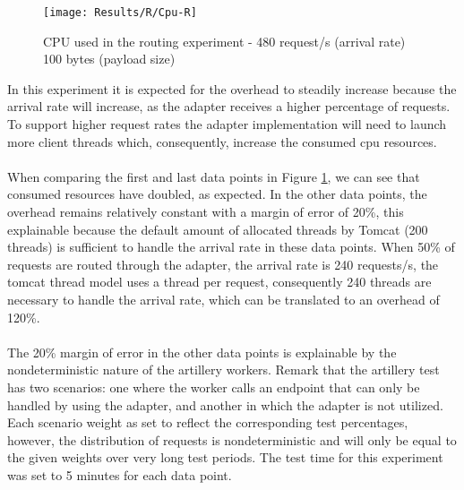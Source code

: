 \begin{figure}[htbp]
    \centering
    \centerline{\texttt{[image: Results/R/Cpu-R]}}
    \caption{CPU used in the routing experiment - 480 request/s (arrival rate) 100 bytes (payload size)}
    \label{fig:routCpu}
\end{figure}

In this experiment it is expected for the overhead to steadily increase because the arrival rate will increase, as the adapter receives a higher percentage of requests. To support higher request rates
the adapter implementation will need to launch more client threads which, consequently, increase the consumed cpu resources.
    
\paragraph{}

When comparing the first and last data points in Figure \ref{fig:routCpu}, we can see that consumed resources have doubled, as expected.
In the other data points, the overhead remains relatively constant with a margin of error of 20\%,
this explainable because the default amount of allocated threads by Tomcat (200 threads) is sufficient to handle the arrival rate in these data points.
When 50\% of requests are routed through the adapter, the arrival rate is 240 requests/s, the tomcat thread model uses a thread per request,
consequently 240 threads are necessary to handle the arrival rate, which can be translated to an overhead of 120\%.

\paragraph{}

The 20\% margin of error in the other data points is explainable by the nondeterministic nature of the artillery workers.
Remark that the artillery test has two scenarios: one where the worker calls an endpoint that can only be handled by using the adapter, and another in which the adapter is not utilized.
Each scenario weight as set to reflect the corresponding test percentages,
however, the distribution of requests is nondeterministic and will only be equal to the given weights over very long test periods.
The test time for this experiment was set to 5 minutes for each data point.

\paragraph{}

